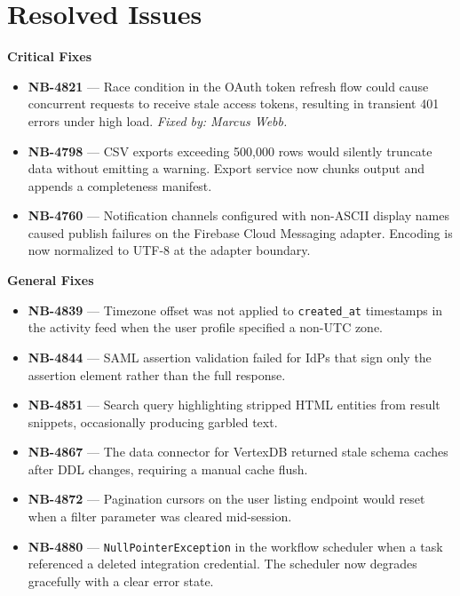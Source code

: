 \section{\faBug\hspace{6pt}Resolved Issues}

\begin{bugbox}
  {\small\bfseries\color{accAmber}Critical Fixes\par}
  \vspace{4pt}

  \begin{itemize}[leftmargin=*,nosep,itemsep=0pt,topsep=4pt]
    \item \textbf{NB-4821} --- Race condition in the OAuth token refresh flow
      could cause concurrent requests to receive stale access tokens, resulting
      in transient 401 errors under high load. \textit{Fixed by: Marcus Webb.}
    \item \textbf{NB-4798} --- CSV exports exceeding 500,000 rows would
      silently truncate data without emitting a warning. Export service now
      chunks output and appends a completeness manifest.
    \item \textbf{NB-4760} --- Notification channels configured with
      non-ASCII display names caused publish failures on the Firebase Cloud
      Messaging adapter. Encoding is now normalized to UTF-8 at the adapter
      boundary.
  \end{itemize}
\end{bugbox}

\begin{bugbox}
  {\small\bfseries\color{accAmber}General Fixes\par}
  \vspace{4pt}

  \begin{itemize}[leftmargin=*,nosep,itemsep=0pt,topsep=4pt]
    \item \textbf{NB-4839} --- Timezone offset was not applied to
      \texttt{created\_at} timestamps in the activity feed when the user
      profile specified a non-UTC zone.
    \item \textbf{NB-4844} --- SAML assertion validation failed for IdPs
      that sign only the assertion element rather than the full response.
    \item \textbf{NB-4851} --- Search query highlighting stripped HTML
      entities from result snippets, occasionally producing garbled text.
    \item \textbf{NB-4867} --- The data connector for VertexDB returned
      stale schema caches after DDL changes, requiring a manual cache flush.
    \item \textbf{NB-4872} --- Pagination cursors on the user listing
      endpoint would reset when a filter parameter was cleared mid-session.
    \item \textbf{NB-4880} --- \texttt{NullPointerException} in the
      workflow scheduler when a task referenced a deleted integration
      credential. The scheduler now degrades gracefully with a clear error
      state.
  \end{itemize}
\end{bugbox}

